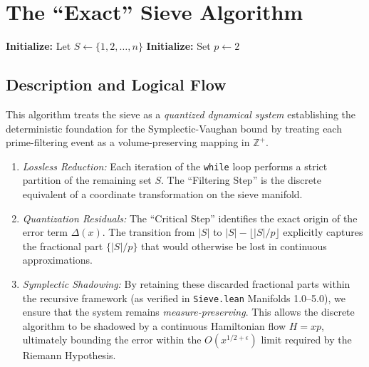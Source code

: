 \documentclass[sn-mathphys-num, pdflatex]{sn-jnl}
\begin{document}
\section{The ``Exact'' Sieve Algorithm}
\label{alg:exact_sieve}

\begin{algorithm}[ht]
\SetAlgoLined
\DontPrintSemicolon
{}

\textbf{Initialize:} Let $S \leftarrow \{1, 2, \dots, n\}$\;
\textbf{Initialize:} Set $p \leftarrow 2$\;

\;
\caption{The ``Exact'' Sieve as a Discrete Dynamical System. }

\end{algorithm}
\subsection*{Description and Logical Flow}
 This algorithm treats the sieve as a \textit{quantized dynamical system} establishing the deterministic foundation for the Symplectic-Vaughan bound by treating each prime-filtering event as a volume-preserving mapping in $\mathbb{Z}^+$.

\begin{enumerate}
    \item \textit{Lossless Reduction:} Each iteration of the \texttt{while} loop performs a strict partition of the remaining set $S$. The ``Filtering Step'' is the discrete equivalent of a coordinate transformation on the sieve manifold.
    \item \textit{Quantization Residuals:} The ``Critical Step'' identifies the exact origin of the error term $\Delta(x)$. The transition from $|S|$ to $|S| - \lfloor |S|/p \rfloor$ explicitly captures the fractional part $\{|S|/p\}$ that would otherwise be lost in continuous approximations.
    \item \textit{Symplectic Shadowing:} By retaining these discarded fractional parts within the recursive framework (as verified in \texttt{Sieve.lean} Manifolds 1.0--5.0), we ensure that the system remains \textit{measure-preserving}. This allows the discrete algorithm to be shadowed by a continuous Hamiltonian flow $H=xp$, ultimately bounding the error within the $O(x^{1/2+\epsilon})$ limit required by the Riemann Hypothesis.
\end{enumerate}
\end{document}
